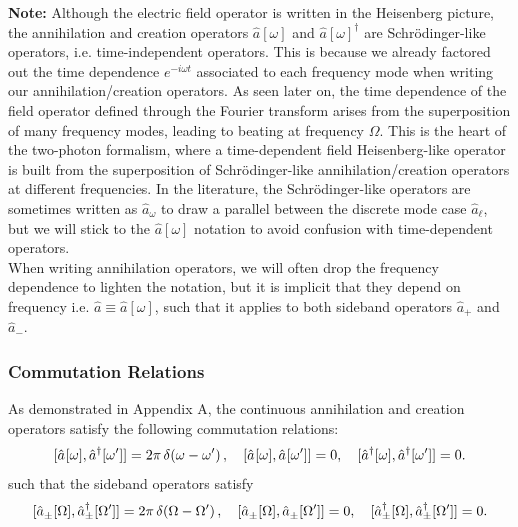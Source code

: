 \noindent \textbf{Note:} Although the electric field operator is written in the Heisenberg picture, the annihilation and creation operators $\hat a[\omega]$ and $\hat a[\omega]^\dagger$ are Schrödinger-like operators, i.e. time-independent operators. This is because we already factored out the time dependence $e^{-i\omega t}$ associated to each frequency mode when writing our annihilation/creation operators. As seen later on, the time dependence of the field operator defined through the Fourier transform arises from the superposition of many frequency modes, leading to beating at frequency $\Omega$. This is the heart of the two-photon formalism, where a time-dependent field Heisenberg-like operator is built from the superposition of Schrödinger-like annihilation/creation operators at different frequencies. In the literature, the Schrödinger-like operators are sometimes written as $\hat a_\omega$ to draw a parallel between the discrete mode case $\hat a_\ell$, but we will stick  to the $\hat a[\omega]$ notation to avoid confusion with time-dependent operators. \\ 

When writing annihilation operators, we will often drop the frequency dependence to lighten the notation, but it is implicit that they depend on frequency i.e. $\hat a \equiv \hat a[\omega]$, such that it applies to both sideband operators $\hat a_+$ and $\hat a_-$. 

\subsubsection{Commutation Relations}
As demonstrated in Appendix A, the continuous annihilation and creation operators satisfy the following commutation relations: 
\[
[\hat{a}^{\vphantom{\dagger}}[\omega], \hat{a}^\dagger[\omega']] = 2\pi \, \delta(\omega - \omega') \,, \quad
[\hat{a}^{\vphantom{\dagger}}[\omega], \hat{a}^{\vphantom{\dagger}}[\omega']] = 0, \quad [\hat{a}^\dagger[\omega], \hat{a}^\dagger[\omega']] = 0.
\]
such that the sideband operators satisfy
\[
[\hat{a}^{\vphantom{\dagger}}_\pm[\Omega], \hat{a}^\dagger_\pm[\Omega']] = 2\pi \, \delta(\Omega - \Omega') \,,  \quad
[\hat{a}^{\vphantom{\dagger}}_\pm[\Omega], \hat{a}^{\vphantom{\dagger}}_\pm[\Omega']] = 0, \quad [\hat{a}^\dagger_\pm[\Omega], \hat{a}^\dagger_\pm[\Omega']] = 0.
\]

